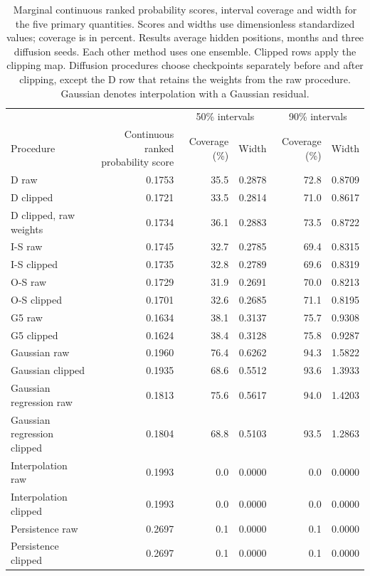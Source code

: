 \documentclass{article}
\begin{document}
\begin{table}[ht]
\centering
\caption{Marginal continuous ranked probability scores, interval coverage and width for the five primary quantities. Scores and widths use dimensionless standardized values; coverage is in percent. Results average hidden positions, months and three diffusion seeds. Each other method uses one ensemble. Clipped rows apply the clipping map. Diffusion procedures choose checkpoints separately before and after clipping, except the D row that retains the weights from the raw procedure. Gaussian denotes interpolation with a Gaussian residual.}
\label{tab:calibration}
\setlength{\tabcolsep}{3.5pt}
\begin{tabular}{lrrrrr}
\toprule
 & & \multicolumn{2}{c}{50\% intervals} & \multicolumn{2}{c}{90\% intervals} \\
Procedure & \parbox[c]{27mm}{\centering Continuous ranked probability score} & Coverage (\%) & Width & Coverage (\%) & Width \\
\midrule
D raw & 0.1753 & 35.5 & 0.2878 & 72.8 & 0.8709 \\
D clipped & 0.1721 & 33.5 & 0.2814 & 71.0 & 0.8617 \\
D clipped, raw weights & 0.1734 & 36.1 & 0.2883 & 73.5 & 0.8722 \\
I-S raw & 0.1745 & 32.7 & 0.2785 & 69.4 & 0.8315 \\
I-S clipped & 0.1735 & 32.8 & 0.2789 & 69.6 & 0.8319 \\
O-S raw & 0.1729 & 31.9 & 0.2691 & 70.0 & 0.8213 \\
O-S clipped & 0.1701 & 32.6 & 0.2685 & 71.1 & 0.8195 \\
G5 raw & 0.1634 & 38.1 & 0.3137 & 75.7 & 0.9308 \\
G5 clipped & 0.1624 & 38.4 & 0.3128 & 75.8 & 0.9287 \\
Gaussian raw & 0.1960 & 76.4 & 0.6262 & 94.3 & 1.5822 \\
Gaussian clipped & 0.1935 & 68.6 & 0.5512 & 93.6 & 1.3933 \\
Gaussian regression raw & 0.1813 & 75.6 & 0.5617 & 94.0 & 1.4203 \\
Gaussian regression clipped & 0.1804 & 68.8 & 0.5103 & 93.5 & 1.2863 \\
Interpolation raw & 0.1993 & 0.0 & 0.0000 & 0.0 & 0.0000 \\
Interpolation clipped & 0.1993 & 0.0 & 0.0000 & 0.0 & 0.0000 \\
Persistence raw & 0.2697 & 0.1 & 0.0000 & 0.1 & 0.0000 \\
Persistence clipped & 0.2697 & 0.1 & 0.0000 & 0.1 & 0.0000 \\
\bottomrule
\end{tabular}
\end{table}
\end{document}
